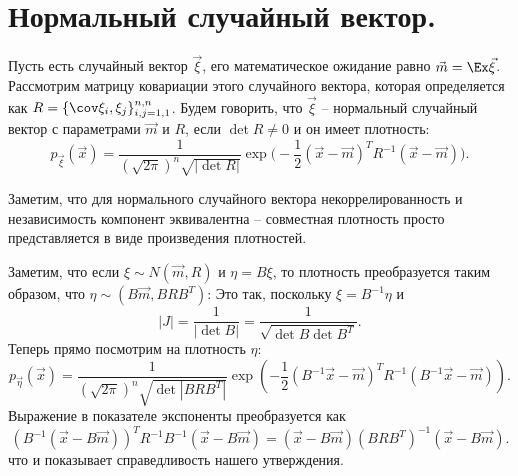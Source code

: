 \section{Нормальный случайный вектор.}
\begin{definition}
    Пусть есть случайный вектор $\vec{\xi}$, его математическое ожидание равно $\vec{m} = \Ex \vec{\xi}$. \\
    Рассмотрим матрицу ковариации этого случайного вектора, которая определяется как $R = \{\cov \xi_i, \xi_j\}_{i, j = 1, 1}^{n, n}$.
    Будем говорить, что $\vec{\xi}$ -- нормальный случайный вектор с параметрами $\vec{m}$ и $R$, если $\det R \neq 0$ и он имеет плотность:
    \[
        p_{\vec{\xi}}(\vec{x}) = \dfrac{1}{(\sqrt {2\pi})^n \sqrt {|\det R|}} \exp\biggr( -\dfrac{1}{2}(\vec{x} - \vec{m})^T R^{-1}(\vec{x} - \vec{m}) \biggr).
    \]
\end{definition}
\begin{lemma}
    Заметим, что для нормального случайного вектора некоррелированность и независимость компонент эквивалентна -- совместная плотность просто представляется в виде произведения плотностей.
\end{lemma}
\begin{note}
    Заметим, что если $\xi \sim N(\vec{m}, R)$ и $\eta = B \xi$, то плотность преобразуется таким образом, что $\eta \sim (B \vec{m}, BRB^T)$:
    Это так, поскольку $\xi = B^{-1}\eta$ и \[|J| = \dfrac{1}{|\det B|} = \dfrac{1}{\sqrt {\det B \det B^T}}.\]
    Теперь прямо посмотрим на плотность $\eta$:
    \[
        p_{\vec{\eta}}(\vec{x}) = \dfrac{1}{(\sqrt{2\pi})^{n} \sqrt{\det|BRB^T|}} \exp (-\dfrac{1}{2}(B^{-1}\vec{x} - \vec{m})^TR^{-1}(B^{-1}\vec{x} - \vec{m})).
    \]
    Выражение в показателе экспоненты преобразуется как
    \[
        (B^{-1}(\vec{x} - B\vec{m}))^T R^{-1} B^{-1}(\vec{x} - B\vec{m}) = (\vec{x} - B\vec{m})(BRB^T)^{-1}(\vec{x} - B\vec{m}).
    \]
    что и показывает справедливость нашего утверждения.
\end{note}

